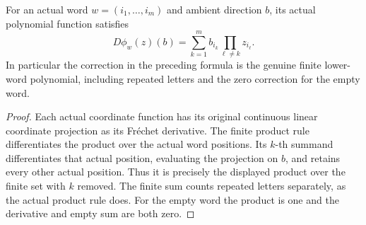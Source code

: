 \begin{theorem}
\label{hir:actual-original-word-directional-correction}
\leanok
For an actual word $w=(i_1,\ldots,i_m)$ and ambient direction $b$, its
actual polynomial function satisfies
\[
 D\phi_w(z)(b)=\sum_{k=1}^{m}b_{i_k}
       \prod_{\ell\ne k}z_{i_\ell}.
\]
In particular the correction in the preceding formula is the genuine
finite lower-word polynomial, including repeated letters and the zero
correction for the empty word.
\end{theorem}
\begin{proof}
Each actual coordinate function has its original continuous linear
coordinate projection as its Fr\'echet derivative. The finite product
rule differentiates the product over the actual word positions. Its
$k$-th summand differentiates that actual position, evaluating the
projection on $b$, and retains every other actual position. Thus it
is precisely the displayed product over the finite set with $k$
removed. The finite sum counts repeated letters separately, as the
actual product rule does. For the empty word the product is one and
the derivative and empty sum are both zero.
\end{proof}
